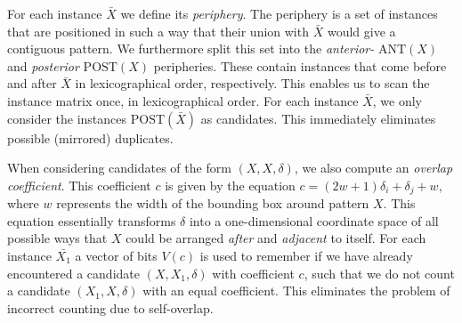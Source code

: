 \documentclass{llncs}
\begin{document}
For each instance $\bar{X}$ we define its \emph{periphery}. The periphery is a set of instances that are positioned in such a way that their union with $\bar{X}$ would give a contiguous pattern. We furthermore split this set into the \emph{anterior-} $\mathrm{ANT}(X)$ and \emph{posterior} $\mathrm{POST}(X)$ peripheries. These contain instances that come before and after $\bar{X}$ in lexicographical order, respectively. This enables us to scan the instance matrix once, in lexicographical order. For each instance $\bar{X}$, we only consider the instances $\mathrm{POST}(\bar{X})$ as candidates. This immediately eliminates possible (mirrored) duplicates. 



When considering candidates of the form $(X,X,\delta)$, we also compute an \emph{overlap coefficient}. This coefficient $c$ is given by the equation $c = (2w+1)\delta_i + \delta_j + w$, where $w$ represents the width of the bounding box around pattern $X$. This equation essentially transforms $\delta$ into a one-dimensional coordinate space of all possible ways that $X$ could be arranged \emph{after} and \emph{adjacent} to itself. For each instance $\bar{X_1}$ a vector of bits $V(c)$ is used to remember if we have already encountered a candidate $(X,X_1,\delta)$ with coefficient $c$, such that we do not count a candidate $(X_1,X,\delta)$ with an equal coefficient. This eliminates the problem of incorrect counting due to self-overlap.
\end{document}
